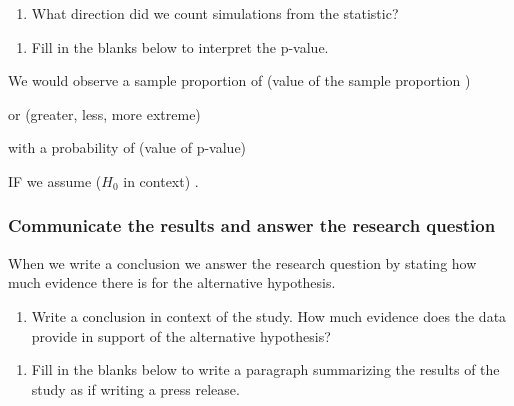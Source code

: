 \documentclass[
]{report}
\providecommand{\tightlist}{%
  \setlength{\itemsep}{0pt}\setlength{\parskip}{0pt}}
\begin{document}
\begin{enumerate}
\def\labelenumi{\arabic{enumi}.}
\setcounter{enumi}{11}
\tightlist
\item
  What direction did we count simulations from the statistic?
  \vspace{0.3in}
\end{enumerate}

\newpage

\begin{enumerate}
\def\labelenumi{\arabic{enumi}.}
\setcounter{enumi}{12}
\tightlist
\item
  Fill in the blanks below to interpret the p-value.
\end{enumerate}


We would observe a sample proportion of (value of the sample proportion )\hrulefill  

or (greater, less, more extreme) \hrulefill   

with a probability of (value of p-value) \hrulefill  

IF we assume (\(H_0\) in context) \hrulefill.

\vspace{12pt}

\hypertarget{communicate-the-results-and-answer-the-research-question}{%
\subsubsection*{Communicate the results and answer the research question}\label{communicate-the-results-and-answer-the-research-question}}

When we write a conclusion we answer the research question by stating how much evidence there is for the alternative hypothesis.

\begin{enumerate}
\def\labelenumi{\arabic{enumi}.}
\setcounter{enumi}{13}
\tightlist
\item
  Write a conclusion in context of the study. How much evidence does the data provide in support of the alternative hypothesis?
\end{enumerate}

\vspace{0.6in}


\begin{enumerate}
\def\labelenumi{\arabic{enumi}.}
\setcounter{enumi}{14}
\tightlist
\item
  Fill in the blanks below to write a paragraph summarizing the results of the study as if writing a press release.
\end{enumerate}
\end{document}

